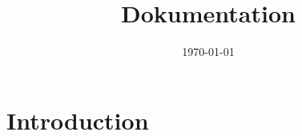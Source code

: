 \documentclass[a4paper, 11pt]{article}
\title{Dokumentation}
\author{}
\date{\today}              %
\begin{document}
\maketitle                 %

\begin{abstract}

\end{abstract}

\section{Introduction}
\end{document}
